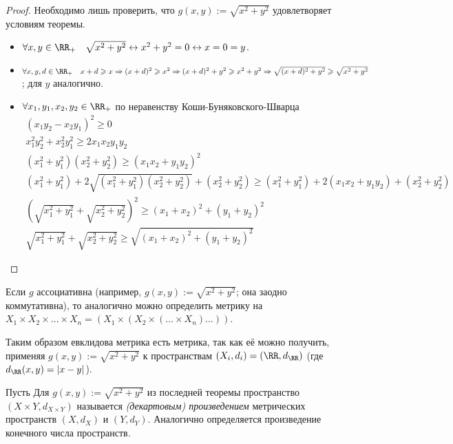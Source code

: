 \documentclass[12pt,a4paper]{article}
\begin{document}
    \begin{proof}
        Необходимо лишь проверить, что $g(x, y) := \sqrt{x^2 + y^2}$ удовлетворяет условиям теоремы.
        \begin{itemize}
            \item $\forall x, y \in \RR_+\quad \sqrt{x^2 + y^2} \leftrightarrow x^2 + y^2 = 0 \leftrightarrow x = 0 = y$.
            \item $\forall x, y, d \in \RR_+\quad x+d \geqslant x \Rightarrow (x+d)^2 \geqslant x^2 \Rightarrow (x+d)^2 + y^2 \geqslant x^2 + y^2 \Rightarrow \sqrt{(x+d)^2 + y^2} \geqslant \sqrt{x^2 + y^2}$; для $y$ аналогично.
            \item $\forall x_1, y_1, x_2, y_2 \in \RR_+$ по неравенству Коши-Буняковского-Шварца
            \begin{gather*}
                (x_1y_2 - x_2y_1)^2 \geqslant 0\\
                x_1^2y_2^2 + x_2^2y_1^2 \geqslant 2x_1x_2y_1y_2\\
                (x_1^2 + y_1^2)(x_2^2 + y_2^2) \geqslant (x_1x_2 + y_1y_2)^2\\
                (x_1^2 + y_1^2) + 2\sqrt{(x_1^2 + y_1^2)(x_2^2 + y_2^2)} + (x_2^2 + y_2^2) \geqslant (x_1^2 + y_1^2) + 2(x_1x_2 + y_1y_2) + (x_2^2 + y_2^2)\\
                \left(\sqrt{x_1^2 + y_1^2} + \sqrt{x_2^2 + y_2^2}\right)^2 \geqslant (x_1 + x_2)^2 + (y_1 + y_2)^2\\
                \sqrt{x_1^2 + y_1^2} + \sqrt{x_2^2 + y_2^2} \geqslant \sqrt{(x_1 + x_2)^2 + (y_1 + y_2)^2}
            \end{gather*}
        \end{itemize}
    \end{proof}

    \begin{remark}
        Если $g$ ассоциативна (например, $g(x, y) := \sqrt{x^2 + y^2}$; она заодно коммутативна), то аналогично можно определить метрику на $X_1 \times X_2 \times \dots \times X_n = (X_1 \times (X_2 \times (\dots \times X_n)\dots))$.

        Таким образом евклидова метрика есть метрика, так как её можно получить, применяя $g(x, y) := \sqrt{x^2 + y^2}$ к пространствам $(X_i, d_i) = (\RR, d_{\RR})$ (где $d_{\RR}(x, y) = |x-y|$).
    \end{remark}

    \begin{definition}
        Пусть 
        Для $g(x, y) := \sqrt{x^2 + y^2}$ из последней теоремы пространство $(X \times Y, d_{X \times Y})$ называется \emph{(декартовым) произведением} метрических пространств $(X, d_X)$ и $(Y, d_Y)$. Аналогично определяется произведение конечного числа пространств.
    \end{definition}
\end{document}
